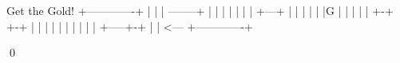 \begin{console}
Get the Gold!
+-------------+
|             |
| --------+ | |  
|         | | |
| +---+ | | | |
| |G  | | |   |
| +-+ +-+ | | |
| | |       | |
| | +-----+-+ |
|               <---
+-------------+
\end{console}
\qed
